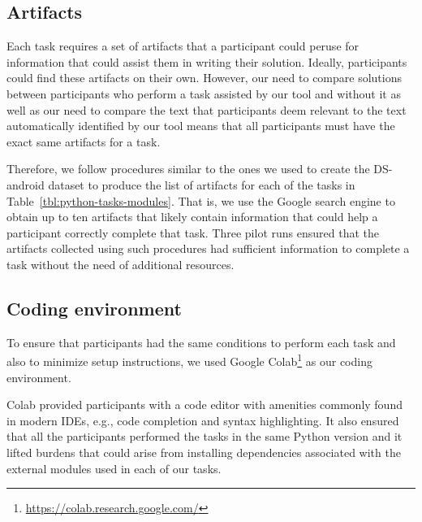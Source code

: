 


\subsection{Artifacts}
\label{cp6:experiment-artifacts}




Each task requires a set of artifacts that a participant could peruse for information that could assist them in writing their solution.
Ideally, participants could find these artifacts on their own. However, our need to compare solutions between participants who perform a task 
assisted by our tool and without it as well as our need to compare the text that participants deem relevant to the text
automatically identified by our tool means that all participants must have the exact same artifacts for a task.


Therefore,
we follow procedures similar to the ones we used to create the \acs{DS-android} dataset to produce the list of artifacts for each of the tasks in Table~\ref{tbl:python-tasks-modules}. 
That is, we use the Google search engine to obtain up to ten artifacts that likely contain 
information that could help a participant correctly complete that task. 
Three pilot runs ensured that the artifacts collected using such procedures had sufficient information to complete a task without 
the need of additional resources. 






\subsection{Coding environment}
\label{cp6:coding-environment}



To ensure that participants had the same conditions to perform each task
and also to minimize setup instructions, we used Google Colab\footnote{\url{https://colab.research.google.com/}} as our coding environment. 


Colab provided participants with a code editor with amenities commonly found in modern IDEs, e.g., code completion and syntax highlighting. It also ensured that all the participants 
performed the tasks in the same Python version and it lifted 
burdens that could arise from installing dependencies associated with the external modules used in each of our tasks. 


